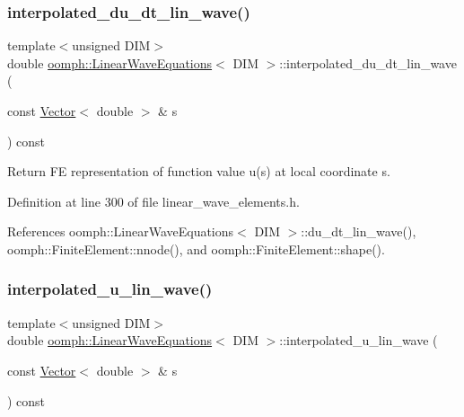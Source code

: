 \subsubsection{\texorpdfstring{interpolated\+\_\+du\+\_\+dt\+\_\+lin\+\_\+wave()}{interpolated\_du\_dt\_lin\_wave()}}
{\footnotesize\ttfamily template$<$unsigned D\+IM$>$ \\
double \hyperlink{classoomph_1_1LinearWaveEquations}{oomph\+::\+Linear\+Wave\+Equations}$<$ D\+IM $>$\+::interpolated\+\_\+du\+\_\+dt\+\_\+lin\+\_\+wave (\begin{DoxyParamCaption}\item[{const \hyperlink{classoomph_1_1Vector}{Vector}$<$ double $>$ \&}]{s }\end{DoxyParamCaption}) const\hspace{0.3cm}{\ttfamily [inline]}}



Return FE representation of function value u(s) at local coordinate s. 



Definition at line 300 of file linear\+\_\+wave\+\_\+elements.\+h.



References oomph\+::\+Linear\+Wave\+Equations$<$ D\+I\+M $>$\+::du\+\_\+dt\+\_\+lin\+\_\+wave(), oomph\+::\+Finite\+Element\+::nnode(), and oomph\+::\+Finite\+Element\+::shape().

\mbox{\label{classoomph_1_1LinearWaveEquations_ac05d4cc1db9dd20b8e6975e5d6ccd530}} 
\subsubsection{\texorpdfstring{interpolated\+\_\+u\+\_\+lin\+\_\+wave()}{interpolated\_u\_lin\_wave()}}
{\footnotesize\ttfamily template$<$unsigned D\+IM$>$ \\
double \hyperlink{classoomph_1_1LinearWaveEquations}{oomph\+::\+Linear\+Wave\+Equations}$<$ D\+IM $>$\+::interpolated\+\_\+u\+\_\+lin\+\_\+wave (\begin{DoxyParamCaption}\item[{const \hyperlink{classoomph_1_1Vector}{Vector}$<$ double $>$ \&}]{s }\end{DoxyParamCaption}) const\hspace{0.3cm}{\ttfamily [inline]}}



